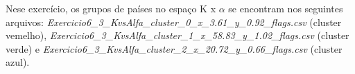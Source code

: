 \begin{figure}[ht!]
	\vspace{0mm}	%
	\begin{center}
	\end{center}
	\vspace{-2mm}	%
	\label{ex6_fig3}
\end{figure}

Nese exercício, os grupos de países no espaço K x $\alpha$ se encontram nos seguintes arquivos: \textit{Exercicio6\_3\_KvsAlfa\_cluster\_0\_x\_3.61\_y\_0.92\_flags.csv} (cluster vemelho), \textit{Exercicio6\_3\_KvsAlfa\_cluster\_1\_x\_58.83\_y\_1.02\_flags.csv} (cluster verde) e \textit{Exercicio6\_3\_KvsAlfa\_cluster\_2\_x\_20.72\_y\_0.66\_flags.csv} (cluster azul).